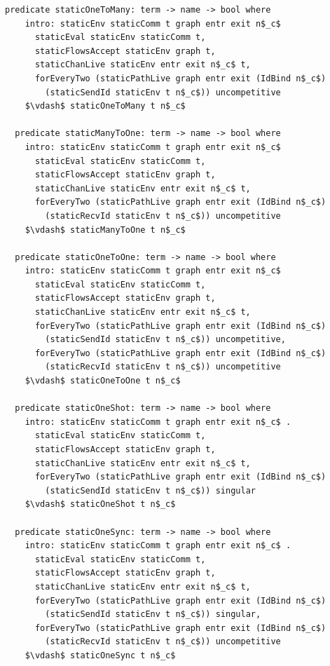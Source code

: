 \documentclass[letterpaper, 11pt]{report}
\begin{document}
\begin{lstlisting}[language=logic, mathescape]
  predicate staticOneToMany: term -> name -> bool where
    intro: staticEnv staticComm t graph entr exit n$_c$ 
      staticEval staticEnv staticComm t,
      staticFlowsAccept staticEnv graph t,
      staticChanLive staticEnv entr exit n$_c$ t, 
      forEveryTwo (staticPathLive graph entr exit (IdBind n$_c$)
        (staticSendId staticEnv t n$_c$)) uncompetitive
    $\vdash$ staticOneToMany t n$_c$

  predicate staticManyToOne: term -> name -> bool where
    intro: staticEnv staticComm t graph entr exit n$_c$ 
      staticEval staticEnv staticComm t,
      staticFlowsAccept staticEnv graph t,
      staticChanLive staticEnv entr exit n$_c$ t, 
      forEveryTwo (staticPathLive graph entr exit (IdBind n$_c$)
        (staticRecvId staticEnv t n$_c$)) uncompetitive
    $\vdash$ staticManyToOne t n$_c$

  predicate staticOneToOne: term -> name -> bool where
    intro: staticEnv staticComm t graph entr exit n$_c$ 
      staticEval staticEnv staticComm t,
      staticFlowsAccept staticEnv graph t,
      staticChanLive staticEnv entr exit n$_c$ t, 
      forEveryTwo (staticPathLive graph entr exit (IdBind n$_c$) 
        (staticSendId staticEnv t n$_c$)) uncompetitive, 
      forEveryTwo (staticPathLive graph entr exit (IdBind n$_c$)
        (staticRecvId staticEnv t n$_c$)) uncompetitive
    $\vdash$ staticOneToOne t n$_c$

  predicate staticOneShot: term -> name -> bool where
    intro: staticEnv staticComm t graph entr exit n$_c$ . 
      staticEval staticEnv staticComm t,
      staticFlowsAccept staticEnv graph t,
      staticChanLive staticEnv entr exit n$_c$ t, 
      forEveryTwo (staticPathLive graph entr exit (IdBind n$_c$)
        (staticSendId staticEnv t n$_c$)) singular
    $\vdash$ staticOneShot t n$_c$

  predicate staticOneSync: term -> name -> bool where
    intro: staticEnv staticComm t graph entr exit n$_c$ . 
      staticEval staticEnv staticComm t,
      staticFlowsAccept staticEnv graph t,
      staticChanLive staticEnv entr exit n$_c$ t, 
      forEveryTwo (staticPathLive graph entr exit (IdBind n$_c$)
        (staticSendId staticEnv t n$_c$)) singular,
      forEveryTwo (staticPathLive graph entr exit (IdBind n$_c$)
        (staticRecvId staticEnv t n$_c$)) uncompetitive 
    $\vdash$ staticOneSync t n$_c$
  \end{lstlisting}
\end{document}
